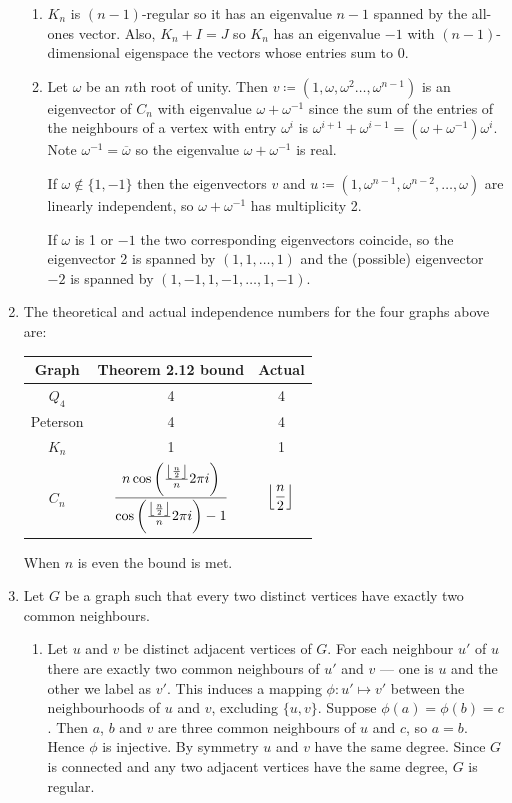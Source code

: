 \documentclass[a4paper, 12pt]{article}
\DeclarePairedDelimiter\floor{\lfloor}{\rfloor}
\begin{document}
\begin{enumerate}
\begin{enumerate}
\item \(K_n\) is \((n-1)\)-regular so it has an eigenvalue \(n-1\) spanned by the all-ones vector. Also, \(K_n+I=J\) so \(K_n\) has an eigenvalue \(-1\) with \((n-1)\)-dimensional eigenspace the vectors whose entries sum to 0.

\item Let \(\omega\) be an \(n\)th root of unity. Then \(v\coloneqq(1,\omega,\omega^2\dots,\omega^{n-1})\) is an eigenvector of \(C_n\) with eigenvalue \(\omega+\omega^{-1}\) since the sum of the entries of the neighbours of a vertex with entry \(\omega^i\) is \(\omega^{i+1}+\omega^{i-1}=(\omega+\omega^{-1})\omega^i\). Note \(\omega^{-1}=\overline\omega\) so the eigenvalue \(\omega+\omega^{-1}\) is real.

If \(\omega\notin\{1,-1\}\) then the eigenvectors \(v\) and \(u\coloneqq(1,\omega^{n-1},\omega^{n-2},\dots,\omega)\) are linearly independent, so \(\omega+\omega^{-1}\) has multiplicity 2.

If \(\omega\) is 1 or \(-1\) the two corresponding eigenvectors coincide, so the eigenvector 2 is spanned by \((1,1,\dots,1)\) and the (possible) eigenvector \(-2\) is spanned by \((1,-1,1,-1,\dots,1,-1)\).

\end{enumerate}

\item The theoretical and actual independence numbers for the four graphs above are:
\begin{center}
\begin{tabular}{@{}ccc@{}}\toprule
Graph&Theorem 2.12 bound&Actual\\\midrule
\(Q_4\)&4&4\\
Peterson&4&4\\
\(K_n\)&1&1\\
\(C_n\)&\(\displaystyle \frac{n\cos\left(\frac{\floor*{\frac n2}}n2\pi i\right)}{\cos\left(\frac{\floor*{\frac n2}}n2\pi i\right)-1}\)&\(\displaystyle\floor*{\frac n2}\)\\
\bottomrule
\end{tabular}
\end{center}
When \(n\) is even the bound is met.

\item Let \(G\) be a graph such that every two distinct vertices have exactly two common neighbours.

\begin{enumerate}

\item Let \(u\) and \(v\) be distinct adjacent vertices of \(G\). For each neighbour \(u'\) of \(u\) there are exactly two common neighbours of \(u'\) and \(v\) --- one is \(u\) and the other we label as \(v'\). This induces a mapping \(\phi\colon u'\mapsto v'\) between the neighbourhoods of \(u\) and \(v\), excluding \(\{u,v\}\). Suppose \(\phi(a)=\phi(b)=c\). Then \(a\), \(b\) and \(v\) are three common neighbours of \(u\) and \(c\), so \(a=b\). Hence \(\phi\) is injective. By symmetry \(u\) and \(v\) have the same degree. Since \(G\) is connected and any two adjacent vertices have the same degree, \(G\) is regular.


\end{enumerate}
\end{enumerate}
\end{document}
